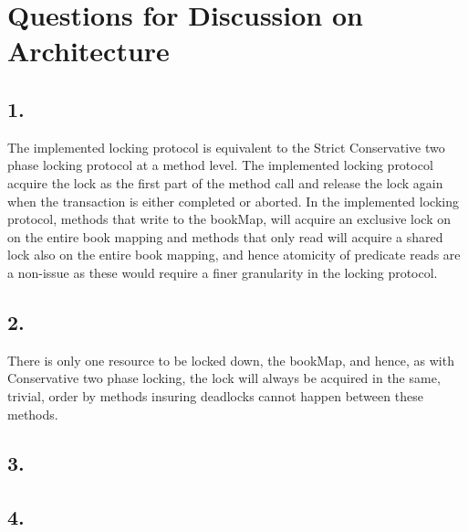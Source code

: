 \documentclass[12pt]{article}
\begin{document}
\section*{Questions for Discussion on Architecture} %
\subsection*{1.} %
The implemented locking protocol is equivalent to the Strict Conservative two phase locking protocol at a method level. The implemented locking protocol acquire the lock as the first part of the method call and release the lock again when the transaction is either completed or aborted. In the implemented locking protocol, methods that write to the bookMap, will acquire an exclusive lock on on the entire book mapping and methods that only read will acquire a shared lock also on the entire book mapping, and hence atomicity of predicate reads are a non-issue as these would require a finer granularity in the locking protocol.
\subsection*{2.} %
There is only one resource to be locked down, the bookMap, and hence, as with Conservative two phase locking, the lock will always be acquired in the same, trivial, order by methods insuring deadlocks cannot happen between these methods.
\subsection*{3.} %

\subsection*{4.} %
\end{document}
